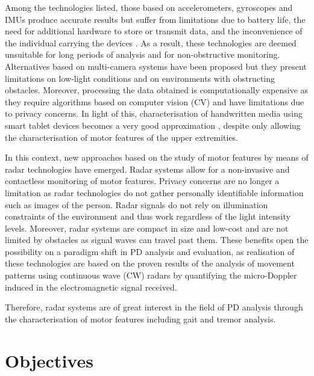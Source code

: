 	Among the technologies listed, those based on accelerometers, gyroscopes and IMUs produce accurate results but suffer from limitations due to battery life, the need for additional hardware to store or transmit data, and the inconvenience of the individual carrying the devices \cite{Biase2020}. As a result, these technologies are deemed unsuitable for long periods of analysis and for non-obstructive monitoring. Alternatives based on multi-camera systems have been proposed \cite{MurodelaHerran2014} but they present limitations on low-light conditions and on environments with obstructing obstacles. Moreover, processing the data obtained is computationally expensive as they require algorithms based on computer vision (CV) and have limitations due to privacy concerns. In light of this, characterisation of handwritten media using smart tablet devices becomes a very good approximation \cite{Danna2019}, despite only allowing the characterisation of motor features of the upper extremities.
	
	In this context, new approaches based on the study of motor features by means of radar technologies have emerged. Radar systems allow for a non-invasive and contactless monitoring of motor features. Privacy concerns are no longer a limitation as radar technologies do not gather personally identifiable information such as images of the person. Radar signals do not rely on illumination constraints of the environment and thus work regardless of the light intensity levels. Moreover, radar systems are compact in size and low-cost and are not limited by obstacles as signal waves can travel past them. These benefits open the possibility on a paradigm shift in PD analysis and evaluation, as realisation of these technologies are based on the proven results of the analysis of movement patterns using continuous wave (CW) radars \cite{Antolinos2020, Seifert2019} by quantifying the micro-Doppler induced in the electromagnetic signal received.
	
	Therefore, radar systems are of great interest in the field of PD analysis through the characterisation of motor features including gait and tremor analysis.
		
\section{Objectives}

